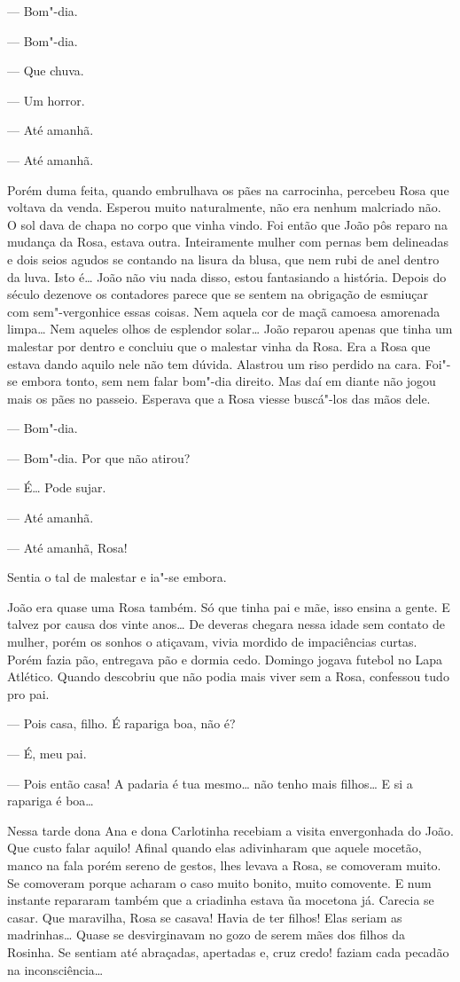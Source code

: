 \begin{linenumbers}
--- Bom"-dia.

--- Bom"-dia.

--- Que chuva.

--- Um horror.

--- Até amanhã. 

--- Até amanhã.

Porém duma feita, quando embrulhava os pães na carrocinha, percebeu Rosa
que voltava da venda. Esperou muito naturalmente, não era nenhum
malcriado não. O sol dava de chapa no corpo que vinha vindo. Foi então
que João pôs reparo na mudança da Rosa, estava outra. Inteiramente
mulher com pernas bem delineadas e dois seios agudos se contando na
lisura da blusa, que nem rubi de anel dentro da luva. Isto é\ldots{} João não
viu nada disso, estou fantasiando a história. Depois do século dezenove
os contadores parece que se sentem na obrigação de esmiuçar com
sem"-vergonhice essas coisas. Nem aquela cor de maçã camoesa amorenada
limpa\ldots{} Nem aqueles olhos de esplendor solar\ldots{} João reparou apenas que
tinha um malestar por dentro e concluiu que o malestar vinha da Rosa.
Era a Rosa que estava dando aquilo nele não tem dúvida. Alastrou um riso
perdido na cara. Foi"-se embora tonto, sem nem falar bom"-dia direito. Mas
daí em diante não jogou mais os pães no passeio. Esperava que a Rosa
viesse buscá"-los das mãos dele.

--- Bom"-dia.

--- Bom"-dia. Por que não atirou?

--- É\ldots{} Pode sujar.

--- Até amanhã.

--- Até amanhã, Rosa!

Sentia o tal de malestar e ia"-se embora.

João era quase uma Rosa também. Só que tinha pai e mãe, isso ensina a
gente. E talvez por causa dos vinte anos\ldots{} De deveras chegara nessa
idade sem contato de mulher, porém os sonhos o atiçavam, vivia mordido
de impaciências curtas. Porém fazia pão, entregava pão e dormia cedo.
Domingo jogava futebol no Lapa Atlético. Quando descobriu que não podia
mais viver sem a Rosa, confessou tudo pro pai.

--- Pois casa, filho. É rapariga boa, não é?

--- É, meu pai. 

--- Pois então casa! A padaria é tua mesmo\ldots{} não tenho mais filhos\ldots{} E
si a rapariga é boa\ldots{}

Nessa tarde dona Ana e dona Carlotinha recebiam a visita envergonhada do
João. Que custo falar aquilo! Afinal quando elas adivinharam que aquele
mocetão, manco na fala porém sereno de gestos, lhes levava a Rosa, se
comoveram muito. Se comoveram porque acharam o caso muito bonito, muito
comovente. E num instante repararam também que a criadinha estava ũa
mocetona já. Carecia se casar. Que maravilha, Rosa se casava! Havia de
ter filhos! Elas seriam as madrinhas\ldots{} Quase se desvirginavam no gozo
de serem mães dos filhos da Rosinha. Se sentiam até abraçadas, apertadas
e, cruz credo! faziam cada pecadão na inconsciência\ldots{}


\end{linenumbers}
